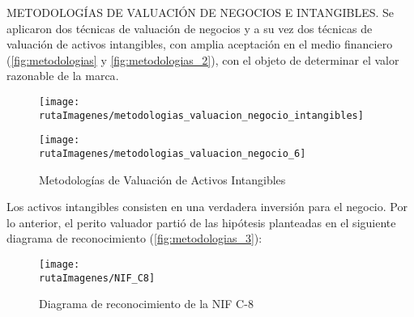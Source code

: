\textcolor{secundario}{METODOLOG\'IAS DE VALUACI\'ON DE NEGOCIOS E INTANGIBLES}. Se aplicaron \textcolor{secundario}{dos t\'ecnicas de valuaci\'on de negocios} y a su vez dos t\'ecnicas de valuaci\'on de activos intangibles, con amplia aceptaci\'on en el medio financiero (\autoref{fig:metodologias} y \autoref{fig:metodologias_2}), con el objeto de determinar el \textcolor{secundario}{valor razonable de la marca}.\\

\begin{figure}[H]
\centering
\caption{Metodolog\'ias de Valuaci\'on de negocios\label{fig:metodologias}}
\texttt{[image: \\rutaImagenes/metodologias\_valuacion\_negocio\_intangibles]}\\

\caption{Metodolog\'ias de Valuaci\'on de Activos Intangibles\label{fig:metodologias_2}}
\texttt{[image: \\rutaImagenes/metodologias\_valuacion\_negocio\_6]}\\

\end{figure}

Los activos intangibles consisten en una verdadera inversi\'on para el negocio. Por lo anterior, el perito valuador parti\'o de las hip\'otesis planteadas en el siguiente diagrama de reconocimiento (\autoref{fig:metodologias_3}):

\begin{figure}[H]
\centering
\caption{Diagrama de reconocimiento de la NIF C-8\label{fig:metodologias_3}}
\texttt{[image: \\rutaImagenes/NIF\_C8]}\\
\end{figure}

